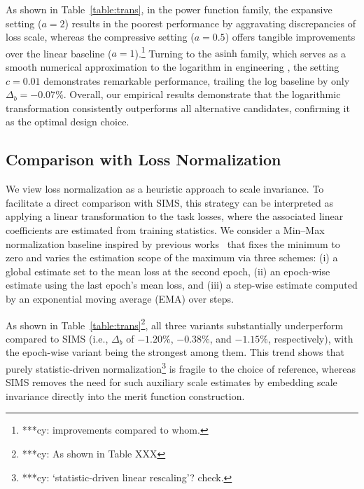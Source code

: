 \documentclass[sigconf]{acmart}
\begin{document}
As shown in Table~\ref{table:trans}, in the power function family, the expansive setting ($a=2$) results in the poorest performance by aggravating discrepancies of loss scale, whereas the compressive setting ($a=0.5$) offers tangible improvements over the linear baseline ($a=1$).\footnote{***cy: improvements compared to whom. } Turning to the $\text{asinh}$ family, which serves as a smooth numerical approximation to the logarithm in engineering \cite{lupton1999modified}, the setting $c=0.01$ demonstrates remarkable performance, trailing the log baseline by only $\Delta_b = -0.07\%$. Overall, our empirical results demonstrate that the logarithmic transformation consistently outperforms all alternative candidates, confirming it as the optimal design choice.


\subsection{Comparison with Loss Normalization}
\label{subsec:prenorm}
We view loss normalization as a heuristic approach to scale invariance. To facilitate a direct comparison with SIMS, this strategy can be interpreted as applying a linear transformation to the task losses, where the associated linear coefficients are estimated from training statistics. We consider a Min–Max normalization baseline inspired by previous works~\cite{dai2023improvable,liu2019end,lakkapragada2023mitigating} that fixes the minimum to zero and varies the estimation scope of the maximum via three schemes: (i) a global estimate set to the mean loss at the second epoch, (ii) an epoch-wise estimate using the last epoch’s mean loss, and (iii) a step-wise estimate computed by an exponential moving average (EMA) over steps.

As shown in Table~\ref{table:trans}\footnote{***cy: As shown in Table XXX }, all three variants substantially underperform compared to SIMS (i.e., $\Delta_b$ of $-1.20\%$, $-0.38\%$, and $-1.15\%$, respectively), with the epoch-wise variant being the strongest among them. This trend shows that purely statistic-driven normalization\footnote{***cy: `statistic-driven linear rescaling'? check. } is fragile to the choice of reference, whereas SIMS removes the need for such auxiliary scale estimates by embedding scale invariance directly into the merit function construction.
\end{document}
